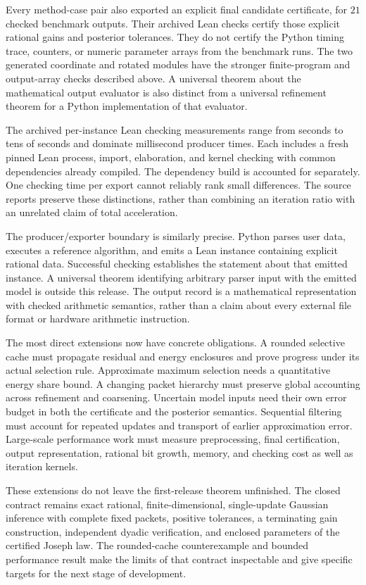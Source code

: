 Every method-case pair also exported an explicit final candidate certificate,
for $21$ checked benchmark outputs. Their archived Lean checks certify those
explicit rational gains and posterior tolerances. They do not certify the Python
timing trace, counters, or numeric parameter arrays from the benchmark runs. The
two generated coordinate and rotated modules have the stronger finite-program and
output-array checks described above. A universal theorem about the mathematical
output evaluator is also distinct from a universal refinement theorem for a
Python implementation of that evaluator.

The archived per-instance Lean checking measurements range from seconds to tens
of seconds and dominate millisecond producer times. Each includes a fresh pinned
Lean process, import, elaboration, and kernel checking with common dependencies
already compiled. The dependency build is accounted for separately. One checking
time per export cannot reliably rank small differences. The source reports preserve
these distinctions, rather than combining an iteration ratio with an unrelated
claim of total acceleration.

The producer/exporter boundary is similarly precise. Python parses user data,
executes a reference algorithm, and emits a Lean instance containing explicit
rational data. Successful checking establishes the statement about that emitted
instance. A universal theorem identifying arbitrary parser input with the emitted
model is outside this release. The output record is a mathematical representation
with checked arithmetic semantics, rather than a claim about every external file
format or hardware arithmetic instruction.

The most direct extensions now have concrete obligations. A rounded selective
cache must propagate residual and energy enclosures and prove progress under its
actual selection rule. Approximate maximum selection needs a quantitative energy
share bound. A changing packet hierarchy must preserve global accounting across
refinement and coarsening. Uncertain model inputs need their own error budget in
both the certificate and the posterior semantics. Sequential filtering must
account for repeated updates and transport of earlier approximation error.
Large-scale performance work must measure preprocessing, final certification,
output representation, rational bit growth, memory, and checking cost as well as
iteration kernels.

These extensions do not leave the first-release theorem unfinished. The closed
contract remains exact rational, finite-dimensional, single-update Gaussian
inference with complete fixed packets, positive tolerances, a terminating gain
construction, independent dyadic verification, and enclosed parameters of the
certified Joseph law. The rounded-cache counterexample and bounded performance
result make the limits of that contract inspectable and give specific targets for
the next stage of development.
